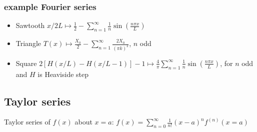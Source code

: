 \documentclass[letterpaper,landscape,10pt]{article}
\newenvironment{myitemize}
{\begin{itemize}
	\setlength{\itemsep}{0pt}
	\setlength{\parskip}{0pt}
	\setlength{\parsep}{0pt}}
{\end{itemize}}
\begin{document}
{\begin{multicols}{4}
   		\subsubsection*{example Fourier series}
		\begin{myitemize}
		  \item[Sawtooth] $x/2L \longmapsto \frac{1}{2} - \sum_{n=1}^\infty \frac{1}{n}\sin\left( \frac{n\pi x}{L} \right)$ \vspace{2.5pt}
		  \item[Triangle] $T(x) \longmapsto \frac{X_0}{2} - \sum_{n=1}^\infty \frac{2X_0}{(\pi k)^2}$, $n$ odd \vspace{2.5pt}
		  \item[Square] $2[H(x/L)-H(x/L-1)]-1 \longmapsto \frac{4}{\pi} \sum_{n=1}^\infty \frac{1}{n} \sin \left( \frac{n\pi x }{L}\right)$, for $n$ odd and $H$ is Heaviside step %
		\end{myitemize}

	\subsection*{Taylor series}
		Taylor series of $f(x)$ about $x=a$: $f(x) = \sum_{n=0}^{\infty}\frac{1}{n!}(x-a)^nf^{(n)}(x=a)$ \\

\end{multicols}}
\end{document}
